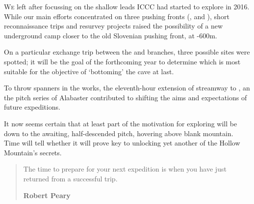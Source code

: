 \newpage
 \thispagestyle{endchapter}
\begin{tcolorbox}
	\vspace{80pt}
	\lettrine{W}{e} left  after focussing on the shallow leads ICCC had started to explore in 2016. While our main efforts concentrated on three pushing fronts (,  and ), short reconnaissance trips and resurvey projects raised the possibility of a new underground camp closer to the old Slovenian pushing front, at -600m. 
	
	On a particular exchange trip between the  and  branches, three possible sites were spotted; it will be the goal of the forthcoming year to determine which is most suitable for the objective of `bottoming' the cave at last. 

	To throw spanners in the works, the eleventh-hour extension of  streamway to , an the pitch series of Alabaster contributed to shifting the aims and expectations of future expeditions. 
	
	It now seems certain that at least part of the motivation for exploring  will be down to the awaiting, half-descended pitch, hovering above blank mountain. Time will tell whether it will prove key to unlocking yet another of the Hollow Mountain's secrets.
	
	\mydelimiter
	
	\begin{quote} The time to prepare for your next expedition is when you have just returned from a successful trip. 
	
	\raggedleft\normalsize\sffamily\textbf{Robert Peary}\par \end{quote}

\end{tcolorbox}

